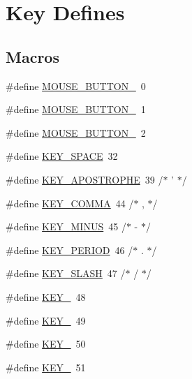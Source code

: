 \hypertarget{group___keys}{\section{Key Defines}
\label{group___keys}
}
\subsection*{Macros}
\begin{DoxyCompactItemize}
\item 
\#define \hyperlink{group___keys_ga04de37b056058b254cdd15a0b2f880de}{M\-O\-U\-S\-E\-\_\-\-B\-U\-T\-T\-O\-N\-\_}~0
\item 
\#define \hyperlink{group___keys_gad8aeb008be1701be89fbc05493b71ca9}{M\-O\-U\-S\-E\-\_\-\-B\-U\-T\-T\-O\-N\-\_}~1
\item 
\#define \hyperlink{group___keys_ga549f3ed1ae1748b1229fd46ce30134ea}{M\-O\-U\-S\-E\-\_\-\-B\-U\-T\-T\-O\-N\-\_}~2
\item 
\#define \hyperlink{group___keys_ga8a5ff83d21dfa704c1c3eff56d5b3a4b}{K\-E\-Y\-\_\-\-S\-P\-A\-C\-E}~32
\item 
\#define \hyperlink{group___keys_ga04c942f1bdb07af34d274e09ae4387d0}{K\-E\-Y\-\_\-\-A\-P\-O\-S\-T\-R\-O\-P\-H\-E}~39  /$\ast$ ' $\ast$/
\item 
\#define \hyperlink{group___keys_ga6aa02ea882191812302aa9d1d26186fc}{K\-E\-Y\-\_\-\-C\-O\-M\-M\-A}~44  /$\ast$ , $\ast$/
\item 
\#define \hyperlink{group___keys_ga3eefcaaf496c52c1c7283caa3d1dab99}{K\-E\-Y\-\_\-\-M\-I\-N\-U\-S}~45  /$\ast$ -\/ $\ast$/
\item 
\#define \hyperlink{group___keys_ga53f3c246f66d6cd725ff79bb3b1e0c74}{K\-E\-Y\-\_\-\-P\-E\-R\-I\-O\-D}~46  /$\ast$ . $\ast$/
\item 
\#define \hyperlink{group___keys_gae98958c265380bd0e491ef368c513196}{K\-E\-Y\-\_\-\-S\-L\-A\-S\-H}~47  /$\ast$ / $\ast$/
\item 
\#define \hyperlink{group___keys_ga51ca76d1508339b071a974798b90474b}{K\-E\-Y\-\_}~48
\item 
\#define \hyperlink{group___keys_ga5a7fd35018971faa28dacd3e33a8f737}{K\-E\-Y\-\_}~49
\item 
\#define \hyperlink{group___keys_ga3a146cb397d373be978dfa9fd1dc9b3a}{K\-E\-Y\-\_}~50
\item 
\#define \hyperlink{group___keys_ga701a135e841c3cfb69d9c5bb1444e198}{K\-E\-Y\-\_}~51
\item 

\end{DoxyCompactItemize}
